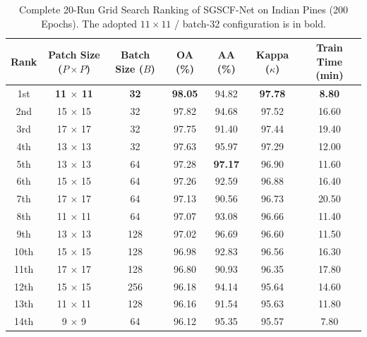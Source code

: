 \documentclass[manuscript,screen,review]{acmart}
\begin{document}
\begin{table}[t]
\centering
\footnotesize
\caption{Complete 20-Run Grid Search Ranking of SGSCF-Net on Indian Pines (200 Epochs). The adopted $11 \times 11$ / batch-32 configuration is in bold.}
\label{tab:grid_search_summary}
\begin{tabular*}{\textwidth}{@{\extracolsep{\fill}}ccccccc}
\toprule
\textbf{Rank} & \textbf{Patch Size ($P \times P$)} & \textbf{Batch Size ($B$)} & \textbf{OA (\%)} & \textbf{AA (\%)} & \textbf{Kappa ($\kappa$)} & \textbf{Train Time (min)} \\
\midrule
1st  & \textbf{11 $\times$ 11} & \textbf{32}  & \textbf{98.05} & 94.82          & \textbf{97.78} & \textbf{8.80} \\
2nd  & 15 $\times$ 15          & 32           & 97.82          & 94.68          & 97.52          & 16.60 \\
3rd  & 17 $\times$ 17          & 32           & 97.75          & 91.40          & 97.44          & 19.40 \\
4th  & 13 $\times$ 13          & 32           & 97.63          & 95.97          & 97.29          & 12.00 \\
5th  & 13 $\times$ 13          & 64           & 97.28          & \textbf{97.17} & 96.90          & 11.60 \\
6th  & 15 $\times$ 15          & 64           & 97.26          & 92.59          & 96.88          & 16.40 \\
7th  & 17 $\times$ 17          & 64           & 97.13          & 90.56          & 96.73          & 20.50 \\
8th  & 11 $\times$ 11          & 64           & 97.07          & 93.08          & 96.66          & 11.40 \\
9th  & 13 $\times$ 13          & 128          & 97.02          & 96.69          & 96.60          & 11.50 \\
10th & 15 $\times$ 15          & 128          & 96.98          & 92.83          & 96.56          & 16.30 \\
11th & 17 $\times$ 17          & 128          & 96.80          & 90.93          & 96.35          & 17.80 \\
12th & 15 $\times$ 15          & 256          & 96.18          & 94.14          & 95.64          & 14.60 \\
13th & 11 $\times$ 11          & 128          & 96.16          & 91.54          & 95.63          & 11.80 \\
14th & 9 $\times$ 9            & 64           & 96.12          & 95.35          & 95.57          & 7.80  \\

\end{tabular*}
\end{table}
\end{document}
